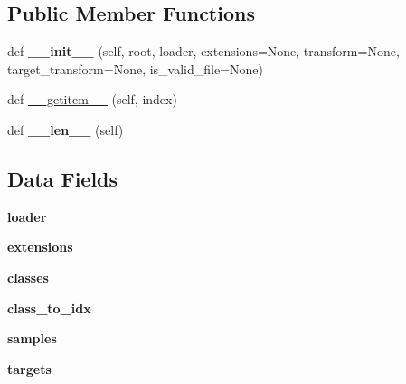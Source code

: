 \subsection*{Public Member Functions}
\begin{DoxyCompactItemize}
\item 
\mbox{\label{classtorchvision_1_1datasets_1_1folder_1_1DatasetFolder_a101d6ff413a22ca3d7dbc490fc8d8c1b}} 
def {\bfseries \+\_\+\+\_\+init\+\_\+\+\_\+} (self, root, loader, extensions=None, transform=None, target\+\_\+transform=None, is\+\_\+valid\+\_\+file=None)
\item 
def \hyperlink{classtorchvision_1_1datasets_1_1folder_1_1DatasetFolder_a5b6284f875125761b82b002617a2eda4}{\+\_\+\+\_\+getitem\+\_\+\+\_\+} (self, index)
\item 
\mbox{\label{classtorchvision_1_1datasets_1_1folder_1_1DatasetFolder_a0459e82673a7ffe5c7c93b9cbb9a3d7f}} 
def {\bfseries \+\_\+\+\_\+len\+\_\+\+\_\+} (self)
\end{DoxyCompactItemize}
\subsection*{Data Fields}
\begin{DoxyCompactItemize}
\item 
\mbox{\label{classtorchvision_1_1datasets_1_1folder_1_1DatasetFolder_ac67a49cf8817ad307d51df0968ab0dd9}} 
{\bfseries loader}
\item 
\mbox{\label{classtorchvision_1_1datasets_1_1folder_1_1DatasetFolder_a8720bec418208b10213118174e3a5ce2}} 
{\bfseries extensions}
\item 
\mbox{\label{classtorchvision_1_1datasets_1_1folder_1_1DatasetFolder_a573dfb1501c984880d5e7d58ab4106fe}} 
{\bfseries classes}
\item 
\mbox{\label{classtorchvision_1_1datasets_1_1folder_1_1DatasetFolder_a8df3944306ecbf2da79ab4e9145ce6e6}} 
{\bfseries class\+\_\+to\+\_\+idx}
\item 
\mbox{\label{classtorchvision_1_1datasets_1_1folder_1_1DatasetFolder_ab2d7e23c39065d9df6c6fa8dd2f36d9a}} 
{\bfseries samples}
\item 
\mbox{\label{classtorchvision_1_1datasets_1_1folder_1_1DatasetFolder_a888f2e8de18a052f2f593bc945fd3215}} 
{\bfseries targets}
\end{DoxyCompactItemize}


